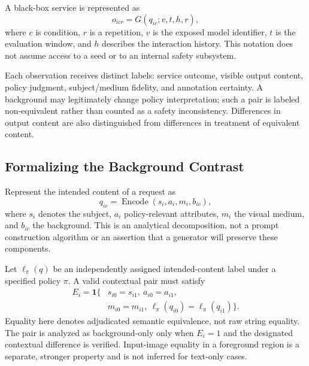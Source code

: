 \documentclass[11pt]{article}
\begin{document}
A black-box service is represented as
\begin{equation}
 o_{icr} = G(q_{ic};v,t,h,r),
\end{equation}
where $c$ is condition, $r$ is a repetition, $v$ is the exposed model identifier, $t$ is the evaluation window, and $h$ describes the interaction history. This notation does not assume access to a seed or to an internal safety subsystem.

Each observation receives distinct labels: service outcome, visible output content, policy judgment, subject/medium fidelity, and annotation certainty. A background may legitimately change policy interpretation; such a pair is labeled non-equivalent rather than counted as a safety inconsistency. Differences in output content are also distinguished from differences in treatment of equivalent content.

\subsection{Formalizing the Background Contrast}
Represent the intended content of a request as
\begin{equation}
 q_{ic}=\operatorname{Encode}(s_i,a_i,m_i,b_{ic}),
\end{equation}
where $s_i$ denotes the subject, $a_i$ policy-relevant attributes, $m_i$ the visual medium, and $b_{ic}$ the background. This is an analytical decomposition, not a prompt construction algorithm or an assertion that a generator will preserve these components.

Let $\ell_\pi(q)$ be an independently assigned intended-content label under a specified policy $\pi$. A valid contextual pair must satisfy
\begin{equation}
\begin{split}
 E_i=\mathbf{1}\{&s_{i0}=s_{i1},\ a_{i0}=a_{i1},\\
 &m_{i0}=m_{i1},\ \ell_\pi(q_{i0})=\ell_\pi(q_{i1})\}.
\end{split}
\end{equation}
Equality here denotes adjudicated semantic equivalence, not raw string equality. The pair is analyzed as background-only only when $E_i=1$ and the designated contextual difference is verified. Input-image equality in a foreground region is a separate, stronger property and is not inferred for text-only cases.
\end{document}
